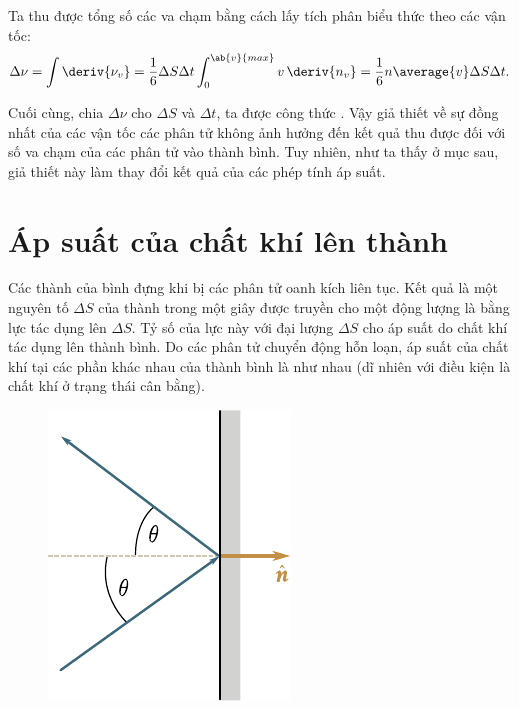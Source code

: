 \noindent
Ta thu được tổng số các va chạm bằng cách lấy tích phân biểu thức  theo các vận tốc:
\begin{equation*}
	\Delta\nu = \int \deriv{\nu_v} = \frac{1}{6} \Delta S \Delta t \int_{0}^{\ab{v}{max}} v\,\deriv{n_v} = \frac{1}{6}n \average{v}\Delta S \Delta t.
\end{equation*}

\noindent
Cuối cùng, chia $\Delta\nu$ cho $\Delta S$ và $\Delta t$, ta được công thức . Vậy giả thiết về sự đồng nhất của các vận tốc các phân tử không ảnh hưởng đến kết quả thu được đối với số va chạm của các phân tử vào thành bình. Tuy nhiên, như ta thấy ở mục sau, giả thiết này làm thay đổi kết quả của các phép tính áp suất.

\section{Áp suất của chất khí lên thành}\label{sec:11_4}

Các thành của bình đựng khi bị các phân tử oanh kích liên tục. Kết quả là một nguyên tố $\Delta S$ của thành trong một giây được truyền cho một động lượng là bằng lực tác dụng lên $\Delta S$. Tỷ số của lực này với đại lượng $\Delta S$ cho áp suất do chất khí tác dụng lên thành bình. Do các phân tử chuyển động hỗn loạn, áp suất của chất khí tại các phần khác nhau của thành bình là như nhau (dĩ nhiên với điều kiện là chất khí ở trạng thái cân bằng).
\begin{figure}[!htb]
	\begin{center}
		\includegraphics[scale=1.0]{figures/ch_11/fig_11_7.pdf}
		\caption[]{}
		\label{fig:11_7}
	\end{center}
	\vspace{-0.8cm}
\end{figure}

